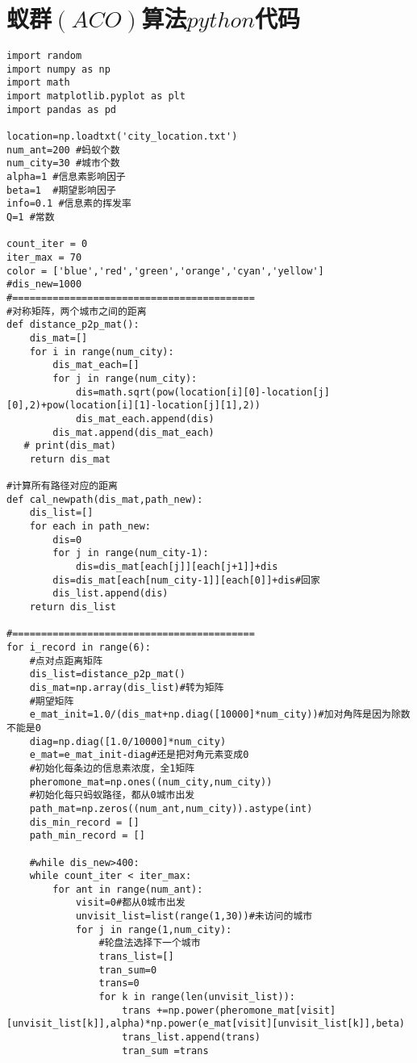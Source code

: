 \section{蚁群$(ACO)$算法$python$代码}
\begin{lstlisting}
import random
import numpy as np
import math
import matplotlib.pyplot as plt
import pandas as pd

location=np.loadtxt('city_location.txt')
num_ant=200 #蚂蚁个数
num_city=30 #城市个数
alpha=1 #信息素影响因子
beta=1  #期望影响因子
info=0.1 #信息素的挥发率
Q=1 #常数

count_iter = 0
iter_max = 70
color = ['blue','red','green','orange','cyan','yellow']
#dis_new=1000
#==========================================
#对称矩阵，两个城市之间的距离
def distance_p2p_mat():
    dis_mat=[]
    for i in range(num_city):
        dis_mat_each=[]
        for j in range(num_city):
            dis=math.sqrt(pow(location[i][0]-location[j][0],2)+pow(location[i][1]-location[j][1],2))
            dis_mat_each.append(dis)
        dis_mat.append(dis_mat_each)
   # print(dis_mat)
    return dis_mat

#计算所有路径对应的距离
def cal_newpath(dis_mat,path_new):
    dis_list=[]
    for each in path_new:
        dis=0
        for j in range(num_city-1):
            dis=dis_mat[each[j]][each[j+1]]+dis
        dis=dis_mat[each[num_city-1]][each[0]]+dis#回家
        dis_list.append(dis)
    return dis_list

#==========================================
for i_record in range(6):
    #点对点距离矩阵
    dis_list=distance_p2p_mat()
    dis_mat=np.array(dis_list)#转为矩阵
    #期望矩阵
    e_mat_init=1.0/(dis_mat+np.diag([10000]*num_city))#加对角阵是因为除数不能是0
    diag=np.diag([1.0/10000]*num_city)
    e_mat=e_mat_init-diag#还是把对角元素变成0
    #初始化每条边的信息素浓度，全1矩阵
    pheromone_mat=np.ones((num_city,num_city))
    #初始化每只蚂蚁路径，都从0城市出发
    path_mat=np.zeros((num_ant,num_city)).astype(int)
    dis_min_record = []
    path_min_record = []

    #while dis_new>400:
    while count_iter < iter_max:
        for ant in range(num_ant):
            visit=0#都从0城市出发
            unvisit_list=list(range(1,30))#未访问的城市
            for j in range(1,num_city):
                #轮盘法选择下一个城市
                trans_list=[]
                tran_sum=0
                trans=0
                for k in range(len(unvisit_list)):
                    trans +=np.power(pheromone_mat[visit][unvisit_list[k]],alpha)*np.power(e_mat[visit][unvisit_list[k]],beta)
                    trans_list.append(trans)
                    tran_sum =trans


\end{lstlisting}
